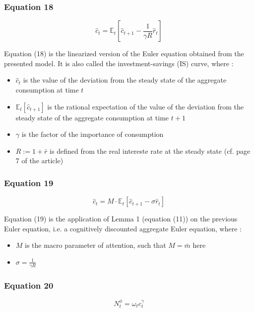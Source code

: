 \documentclass{article}
\begin{document}
\subsubsection*{Equation 18}
\begin{equation}
    \hat{c}_{t}=\mathbb{E}_{t}\left[\hat{c}_{t+1}-\frac{1}{\gamma R}\hat{r}_{t}\right]
\end{equation}

Equation (18) is the linearized version of the Euler equation obtained from the presented model. It is also called the investment-savings (IS) curve, where : 
\begin{itemize}
    \item $\hat{c}_{t}$ is the value of the deviation from the steady state of the aggregate consumption at time $t$
    \item $\mathbb{E}_{t}\left[\hat{c}_{t+1}\right]$ is the rational expectation of the value of the deviation from the steady state of the aggregate consumption at time $t+1$
    \item $\gamma$ is the factor of the importance of consumption
    \item $R:=1+\bar{r}$ is defined from the real intereste rate at the steady state (cf. page 7 of the article)
\end{itemize}

\subsubsection*{Equation 19}
\begin{equation}
    \hat{c}_{t}=M\cdot\mathbb{E}_{t}\left[\hat{c}_{t+1}-\sigma\hat{r}_{t}\right]
\end{equation}

Equation (19) is the application of Lemma 1 (equation (11)) on the previous Euler equation, i.e. a cognitively discounted aggregate Euler equation, where : 
\begin{itemize}
    \item $M$ is the macro parameter of attention, such that $M=\bar{m}$ here
    \item $\sigma=\frac{1}{\gamma R}$
\end{itemize}

\subsubsection*{Equation 20}
\begin{equation}
    N^{\phi}_{t}=\omega_{t}c_{t}^{\gamma}
\end{equation}
\end{document}
